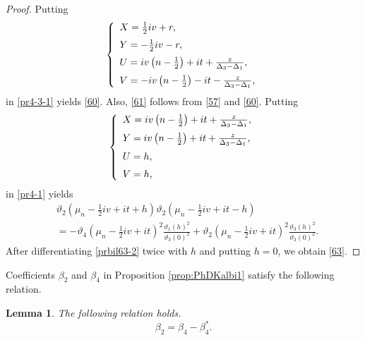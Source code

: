 \documentclass[10pt,leqno]{amsart}
\newtheorem{lem}[theorem]{Lemma}
\numberwithin{equation}{section}
\begin{document}
\begin{proof}
Putting
\begin{eqnarray}\label{prbil60-1}
\left\{
\begin{array}{l}
\vspace{2mm}
X=\frac{1}{2}iv+r,\\
\vspace{2mm}
Y=-\frac{1}{2}iv-r,\\
\vspace{2mm}
U=iv\left(n-\frac{1}{2}\right)+it+\frac{z}{\Delta_{3}-\Delta_{1}},\\
V=-iv\left(n-\frac{1}{2}\right)-it-\frac{z}{\Delta_{3}-\Delta_{1}},\\
\end{array}
\right.
\end{eqnarray}
in \eqref{pr4-3-1} yields \eqref{60}.
Also, \eqref{61} follows from \eqref{57} and \eqref{60}.
Putting
\begin{eqnarray}\label{prbil63-1}
\left\{
\begin{array}{l}
\vspace{2mm}
X=iv\left(n-\frac{1}{2}\right)+it+\frac{z}{\Delta_{3}-\Delta_{1}},\\
\vspace{2mm}
Y=iv\left(n-\frac{1}{2}\right)+it+\frac{z}{\Delta_{3}-\Delta_{1}},\\
\vspace{2mm}
U=h,\\
V=h,\\
\end{array}
\right.
\end{eqnarray}
in \eqref{pr4-1} yields
\begin{equation}\label{prbil63-2}
\begin{split}
&\vartheta_2\left(\mu_{n}-\frac{1}{2}iv+it+h\right)\vartheta_2\left(\mu_{n}-\frac{1}{2}iv+it-h\right)\\
&=-\vartheta_4\left(\mu_{n}-\frac{1}{2}iv+it\right)^{2}\frac{\vartheta_1\left(h\right)^{2}}{\vartheta_3\left(0\right)^{2}}+\vartheta_2\left(\mu_{n}-\frac{1}{2}iv+it\right)^{2}\frac{\vartheta_3\left(h\right)^{2}}{\vartheta_3\left(0\right)^{2}}.
\end{split}
\end{equation}
After differentiating \eqref{prbil63-2} twice with $h$ and putting $h=0$, we obtain \eqref{63}. 
\end{proof}
Coefficients $\beta_{2}$ and $\beta_{4}$ in Proposition \ref{prop:PhDKalbi1} satisfy the following relation.
\begin{lem}\label{prop:56}
The following relation holds.
\begin{equation}\label{56}
\beta_{2}=\beta_{4}-\beta_{4}^{*}.
\end{equation}
\end{lem}
\end{document}
